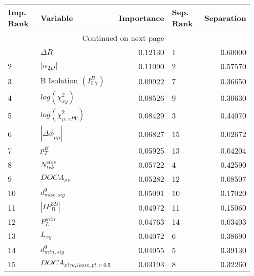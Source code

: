 

\begin{longtable}{llrlr}
\toprule
Imp. Rank &                     Variable &  Importance & Sep. Rank &  Separation \\
\midrule
\endhead
\midrule
\multicolumn{3}{r}{{Continued on next page}} \\
\midrule
\endfoot

\bottomrule
\endlastfoot
        1 &                   $\Delta R$ &     0.12130 &         1 &     0.60000 \\
        2 &              $|\alpha_{2D}|$ &     0.11090 &         2 &     0.57570 \\
        3 &  B Isolation $(I^{B}_{0.7})$ &     0.09922 &         7 &     0.36650 \\
        4 &         $log(\chi^{2}_{xy})$ &     0.08526 &         9 &     0.30630 \\
        5 &    $log(\chi^{2}_{\mu,xPV})$ &     0.08429 &         3 &     0.44070 \\
        6 &     $|\Delta \phi_{\mu\mu}|$ &     0.06827 &        15 &     0.02672 \\
        7 &                    $p^B_{T}$ &     0.05925 &        13 &     0.04204 \\
        8 &             $N^{clos}_{trk}$ &     0.05722 &         4 &     0.42590 \\
        9 &              $DOCA_{\mu\mu}$ &     0.05282 &        12 &     0.08507 \\
       10 &             $d^0_{max, sig}$ &     0.05091 &        10 &     0.17020 \\
       11 &              $|IP_{B}^{3D}|$ &     0.04972 &        11 &     0.15060 \\
       12 &                $P^{min}_{L}$ &     0.04763 &        14 &     0.03403 \\
       13 &                     $L_{xy}$ &     0.04072 &         6 &     0.38690 \\
       14 &             $d^0_{min, sig}$ &     0.04055 &         5 &     0.39130 \\
       15 &   $DOCA_{xtrk,loose,pt>0.5}$ &     0.03193 &         8 &     0.32260 \\
\end{longtable}

